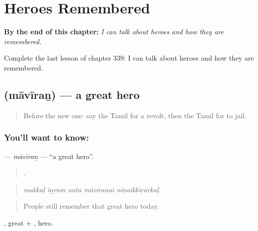 
\chapter{Heroes Remembered}
\label{ch:ta-heroes-remembered}

\begin{chapteropening}
\textbf{By the end of this chapter:} \emph{I can talk about heroes and how they are remembered.}

Complete the last lesson of chapter 339: I can talk about heroes and how they are remembered.
\end{chapteropening}

\section[\texorpdfstring{\ta{மாவீரன்} (māvīraṉ)}{மாவீரன் (māvīraṉ)}]{ (māvīraṉ) — a great hero}

\label{lesson:TA-C339-maviran}



\begin{quote}
Before the new one: say the Tamil for a revolt, then the Tamil for to jail.
\end{quote}

\subsection*{You'll want to know: }
\textbf{} — \emph{māvīraṉ} — \textquotedblleft{}a great hero\textquotedblright{}.

\begin{quote}
    .
\end{quote}

\begin{quote}
\emph{makkaḷ iṉṟum anta māvīraṉai niṉaikkiṟārkaḷ.}
\end{quote}

\begin{quote}
People still remember that great hero today.
\end{quote}

, great + , hero.

